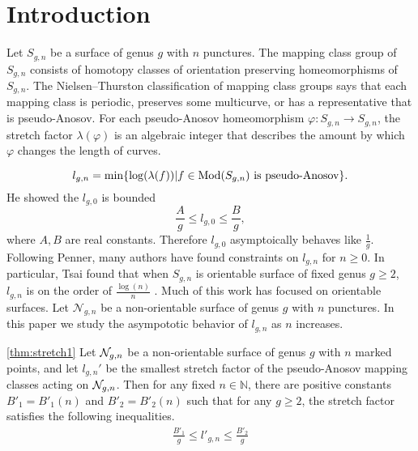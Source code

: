 \section{Introduction}
\label{sec:introduction}

Let $S_{g,n}$ be a surface of genus $g$ with $n$ punctures.  The mapping class group of $S_{g,n}$ consists of homotopy classes of orientation preserving homeomorphisms of $S_{g,n}$.  The Nielsen--Thurston classification of mapping class groups says that each mapping class is periodic, preserves some multicurve, or has a representative that is pseudo-Anosov.  For each pseudo-Anosov homeomorphism $\varphi:S_{g,n}\rightarrow S_{g,n}$, the stretch factor $\lambda(\varphi)$ is an algebraic integer that describes the amount by which $\varphi$ changes the length of curves.%


$$l_{g,n}=\min\{\log(\lambda(f)) | f\in\operatorname{Mod}(S_{g,n}) \text{ is pseudo-Anosov}\}.$$ 
He showed the $l_{g,0}$ is bounded $$\frac{A}{g}\leq l_{g,0}\leq \frac{B}{g},$$ where $A,B$ are real constants.  Therefore $l_{g,0}$ asymptoically behaves like $\frac{1}{g}$.  Following Penner, many authors have found constraints on $l_{g,n}$ for $n\geq 0$.  In particular, Tsai found that when $S_{g,n}$ is orientable surface of fixed genus $g\geq 2$, $l_{g,n}$ is on the order of $\frac{\log(n)}{n}$ \cite{tsai2009asymptotic}. Much of this work has focused on orientable surfaces.  Let $\mathcal{N}_{g,n}$ be a non-orientable surface of genus $g$ with $n$ punctures.  In this paper we study the asympototic behavior of $l_{g,n}$ as $n$ increases.

\begin{manualtheorem}{\ref{thm:stretch1}}
  Let $\mathcal{N}_{g,n}$ be a non-orientable surface of genus $g$ with $n$ marked points, and let $l_{g,n}'$ be
  the smallest stretch factor of the pseudo-Anosov mapping classes acting on $\mathcal{N}_{g,n}$.
  Then for any fixed $n \in \mathbb{N}$, there are positive constants $B'_1 = B'_1(n)$ and $B'_2 = B'_2(n)$ such
  that for any $g \geq 2$, the stretch factor satisfies the following inequalities.
  \begin{align*}
    \frac{B'_1}{g} \leq l'_{g,n} \leq \frac{B'_2}{g}
  \end{align*}
\end{manualtheorem}

